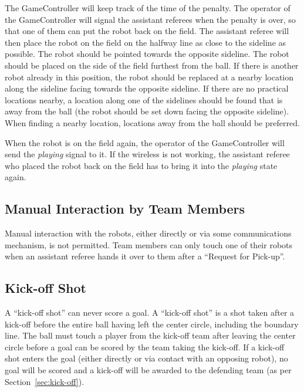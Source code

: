 \documentclass[12pt]{article}
\begin{document}
The GameController will keep track of the time of the penalty. The
operator of the GameController will signal the assistant referees
when the penalty is over, so that one of them can put the robot back
on the field. The assistant referee will then place the robot on the
field on the halfway line as close to the sideline as possible.  The
robot should be pointed towards the opposite sideline.  The robot
should be placed on the side of the field furthest from the ball.
If there is another robot already in this position, the robot should
be replaced at a nearby location along the sideline facing towards
the opposite sideline.  If there are no practical locations nearby,
a location along one of the sidelines should be found that is away
from the ball (the robot should be set down facing the opposite
sideline).  When finding a nearby location, locations away from the
ball should be preferred.

When the robot is on the field again, the operator of the
GameController will send the \emph{playing} signal to it.
If the
wireless is not working, the assistant referee who placed the robot
back on the field has to bring it into the \emph{playing} state
again.

\subsection{Manual Interaction by Team Members}

Manual interaction with the robots, either directly or via some
communications mechanism, is not permitted. Team members can only
touch one of their robots when an assistant referee hands it over to
them after a ``Request for Pick-up''.

\subsection{Kick-off Shot}
\label{sec:kick-off_shot}

A ``kick-off shot'' can never score a goal.  A ``kick-off shot'' is
a shot taken after a kick-off before the entire ball having left the
center circle, including the boundary line.  The ball must touch a
player from the kick-off team after leaving the center circle before
a goal can be scored by the team taking the kick-off.  If a kick-off
shot enters the goal (either directly or via contact with an
opposing robot), no goal will be scored and a kick-off will be
awarded to the defending team (as per Section~\ref{sec:kick-off}).
\end{document}
